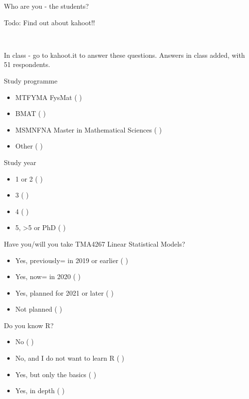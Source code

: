 \documentclass[10pt,ignorenonframetext,]{beamer}
\providecommand{\tightlist}{%
  \setlength{\itemsep}{0pt}\setlength{\parskip}{0pt}}
\begin{document}
\begin{frame}{Who are you - the students?}

Todo: Find out about kahoot!!

~

In class - go to kahoot.it to answer these questions. Answers in class
added, with 51 respondents.

\begin{block}{Study programme}

\begin{itemize}
\tightlist
\item
  MTFYMA FysMat ( )
\item
  BMAT ( )
\item
  MSMNFNA Master in Mathematical Sciences ( )
\item
  Other ( )
\end{itemize}

\end{block}

\begin{block}{Study year}

\begin{itemize}
\tightlist
\item
  1 or 2 ( )
\item
  3 ( )
\item
  4 ( )
\item
  5, \textgreater{}5 or PhD ( )
\end{itemize}

\end{block}

\end{frame}

\begin{frame}

\begin{block}{Have you/will you take TMA4267 Linear Statistical Models?}

\begin{itemize}
\tightlist
\item
  Yes, previously= in 2019 or earlier ( )
\item
  Yes, now= in 2020 ( )
\item
  Yes, planned for 2021 or later ( )
\item
  Not planned ( )
\end{itemize}

\end{block}

\begin{block}{Do you know R?}

\begin{itemize}
\tightlist
\item
  No ( )
\item
  No, and I do not want to learn R ( )
\item
  Yes, but only the basics ( )
\item
  Yes, in depth ( )
\end{itemize}

\end{block}

\end{frame}
\end{document}
